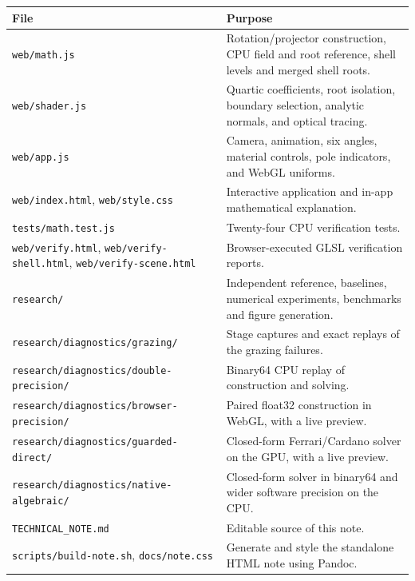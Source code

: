 \documentclass[11pt,a4paper]{article}
\begin{document}
{
\begin{longtable}[]{@{}
  >{\raggedright\arraybackslash}p{}
  >{\raggedright\arraybackslash}p{}@{}}
\toprule\noalign{}
\begin{minipage}[b]{\linewidth}\raggedright
File
\end{minipage} & \begin{minipage}[b]{\linewidth}\raggedright
Purpose
\end{minipage} \\
\midrule\noalign{}
\endhead
\bottomrule\noalign{}
\endlastfoot
\texttt{web/math.js} & Rotation/projector construction, CPU field and
root reference, shell levels and merged shell roots. \\
\texttt{web/shader.js} & Quartic coefficients, root isolation, boundary
selection, analytic normals, and optical tracing. \\
\texttt{web/app.js} & Camera, animation, six angles, material controls,
pole indicators, and WebGL uniforms. \\
\texttt{web/index.html}, \texttt{web/style.css} & Interactive
application and in-app mathematical explanation. \\
\texttt{tests/math.test.js} & Twenty-four CPU verification tests. \\
\texttt{web/verify.html}, \texttt{web/verify-shell.html},
\texttt{web/verify-scene.html} & Browser-executed GLSL verification
reports. \\
\texttt{research/} & Independent reference, baselines, numerical
experiments, benchmarks and figure generation. \\
\texttt{research/diagnostics/grazing/} & Stage captures and exact
replays of the grazing failures. \\
\texttt{research/diagnostics/double-precision/} & Binary64 CPU replay of
construction and solving. \\
\texttt{research/diagnostics/browser-precision/} & Paired float32
construction in WebGL, with a live preview. \\
\texttt{research/diagnostics/guarded-direct/} & Closed-form
Ferrari/Cardano solver on the GPU, with a live preview. \\
\texttt{research/diagnostics/native-algebraic/} & Closed-form solver in
binary64 and wider software precision on the CPU. \\
\texttt{TECHNICAL\_NOTE.md} & Editable source of this note. \\
\texttt{scripts/build-note.sh}, \texttt{docs/note.css} & Generate and
style the standalone HTML note using Pandoc. \\
\end{longtable}
}
\end{document}
